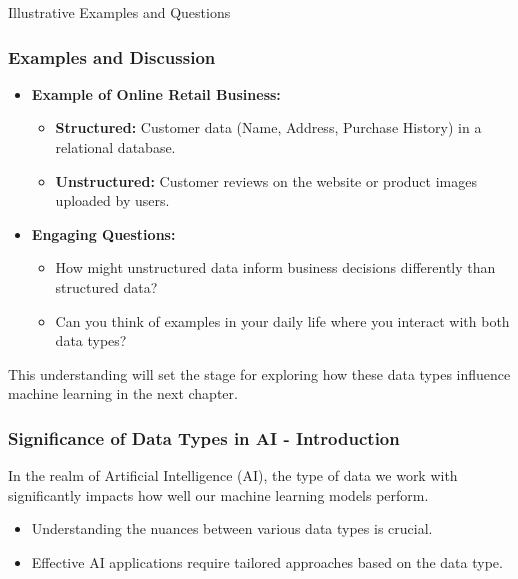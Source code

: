 \documentclass[aspectratio=169]{beamer}
\begin{document}
\begin{frame}[fragile]{Illustrative Examples and Questions}
  \frametitle{Examples and Discussion}
  
  \begin{itemize}
    \item \textbf{Example of Online Retail Business:}
    \begin{itemize}
      \item \textbf{Structured:} Customer data (Name, Address, Purchase History) in a relational database.
      \item \textbf{Unstructured:} Customer reviews on the website or product images uploaded by users.
    \end{itemize}
    
    \item \textbf{Engaging Questions:}
    \begin{itemize}
      \item How might unstructured data inform business decisions differently than structured data?
      \item Can you think of examples in your daily life where you interact with both data types?
    \end{itemize}
  \end{itemize}
  
  This understanding will set the stage for exploring how these data types influence machine learning in the next chapter.
\end{frame}

\begin{frame}[fragile]
    \frametitle{Significance of Data Types in AI - Introduction}
    In the realm of Artificial Intelligence (AI), the type of data we work with significantly impacts how well our machine learning models perform. 
    \begin{itemize}
        \item Understanding the nuances between various data types is crucial.
        \item Effective AI applications require tailored approaches based on the data type.
    \end{itemize}
\end{frame}
\end{document}
